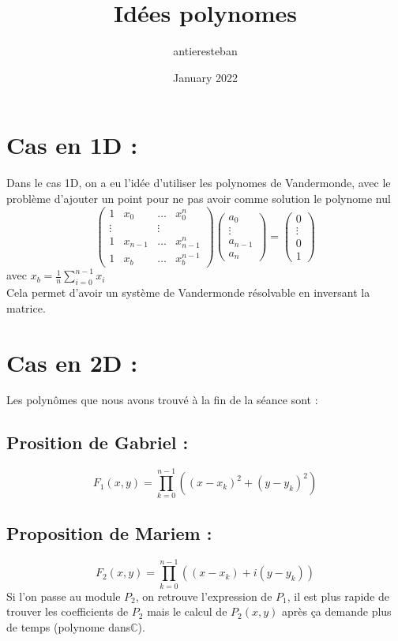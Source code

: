 \documentclass{article}
\title{Idées polynomes}
\author{antieresteban}
\date{January 2022}
\begin{document}
\section{Cas en 1D :}
Dans le cas 1D, on a eu l'idée d'utiliser les polynomes de Vandermonde, avec le problème d'ajouter un point pour ne pas avoir comme solution le polynome nul
\begin{equation*}
    \begin{pmatrix}
    1 & x_0 & \dots & x_{0}^{n} \\
    \vdots & & \vdots \\
    1 & x_{n-1} & \dots & x_{n-1}^{n} \\
    1 & x_b & \dots & x_b^{n-1} 
    \end{pmatrix}
    \begin{pmatrix}
    a_0\\
    \vdots\\
    a_{n-1}\\
    a_{n}
    \end{pmatrix}
    =
    \begin{pmatrix}
    0\\
    \vdots\\
    0\\
    1
    \end{pmatrix}
\end{equation*}
avec $x_b = \frac{1}{n}\sum_{i=0}^{n-1} x_i$\\
Cela permet d'avoir un système de Vandermonde résolvable en inversant la matrice.


\section{Cas en 2D :}
Les polynômes que nous avons trouvé à la fin de la séance sont :

\subsection{Prosition de Gabriel :}
\begin{equation*}
    F_1(x,y) = \prod_{k=0}^{n-1}((x-x_k)^2 + (y-y_k)^2)
\end{equation*}

\subsection{Proposition de Mariem :}
\begin{equation*}
    F_2(x,y) = \prod_{k=0}^{n-1}((x-x_k) + i(y-y_k))
\end{equation*}
Si l'on passe au module $P_2$, on retrouve l'expression de $P_1$, il est plus rapide de trouver les coefficients de $P_2$ mais le calcul de $P_2(x,y)$ après ça demande plus de temps (polynome dans$\mathbb{C}$).\\
\end{document}
